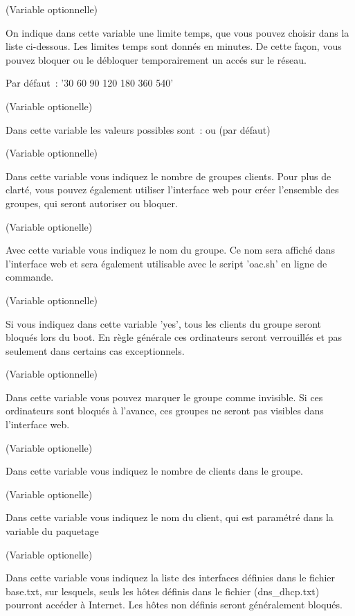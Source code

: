 \begin{description}
 (Variable optionnelle)

    On indique dans cette variable une limite temps, que vous pouvez choisir
    dans la liste ci-dessous. Les limites temps sont donnés en minutes. De
    cette façon, vous pouvez bloquer ou le débloquer temporairement un accés
    sur le réseau.

    Par défaut~: '30 60 90 120 180 360 540'

 (Variable optionelle)

    Dans cette variable les valeurs possibles sont~:  ou  (par défaut)

 (Variable optionnelle)

    Dans cette variable vous indiquez le nombre de groupes clients. Pour plus de
    clarté, vous pouvez également utiliser l'interface web pour créer l'ensemble
    des groupes, qui seront autoriser ou bloquer.

 (Variable optionelle)

    Avec cette variable vous indiquez le nom du groupe. Ce nom sera affiché dans
    l'interface web et sera également utilisable avec le script 'oac.sh' en
    ligne de commande.

 (Variable optionnelle)

    Si vous indiquez dans cette variable 'yes', tous les clients du groupe
    seront bloqués lors du boot. En règle générale ces ordinateurs seront
    verrouillés et pas seulement dans certains cas exceptionnels.

 (Variable optionnelle)

    Dans cette variable vous pouvez marquer le groupe comme invisible. Si ces
    ordinateurs sont bloqués à l'avance, ces groupes ne seront pas visibles
    dans l'interface web.

 (Variable optionelle)

    Dans cette variable vous indiquez le nombre de clients dans le groupe.

 (Variable optionelle)

    Dans cette variable vous indiquez le nom du client, qui est paramétré dans
	la variable {} du paquetage 

 (Variable optionelle)

    Dans cette variable vous indiquez la liste des interfaces définies dans
    le fichier base.txt, sur lesquels, seuls les hôtes définis dans le fichier
    (dns\_dhcp.txt) pourront accéder à Internet. Les hôtes non définis seront
    généralement bloqués.

\end{description}


